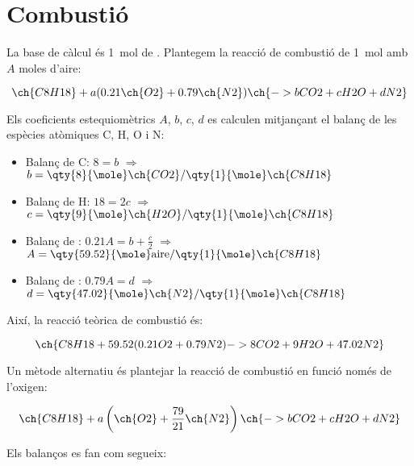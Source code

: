 \chapter{Combustió}

\begin{mybox}[title=Determinació de la reacció teòrica de combustió del \textit{n}-octà amb aire]

    La base de càlcul és \qty{1}{\mole} de . Plantegem la reacció de combustió de \qty{1}{\mole} amb $A$ moles d'aire:

    \begin{equation}
        \ch{C8H18} + a(0.21 \ch{O2} + 0.79 \ch{N2}) \ch{-> b CO2 + c H2O + d N2}
    \end{equation}
    
    Els coeficients estequiomètrics $A$, $b$, $c$, $d$ es calculen mitjançant el balanç de les espècies atòmiques C, H, O i N:
    
    \begin{itemize}
        \item Balanç de C: \quad $8 = b$ \quad $\Rightarrow$ \quad $b = \qty{8}{\mole} \ch{CO2}/\qty{1}{\mole} \ch{C8H18}$
        \item Balanç de H: \quad $18 = 2c$ \quad $\Rightarrow$ \quad $c = \qty{9}{\mole} \ch{H2O}/\qty{1}{\mole} \ch{C8H18}$
        \item Balanç de : \quad $0.21A = b + \frac{c}{2}$ \quad $\Rightarrow$ \quad $A = \qty{59.52}{\mole} \text{aire}/\qty{1}{\mole} \ch{C8H18}$
        \item Balanç de : \quad $0.79A = d$ \quad $\Rightarrow$ \quad $d = \qty{47.02}{\mole} \ch{N2}/\qty{1}{\mole} \ch{C8H18}$
    \end{itemize}
    
    Així, la reacció teòrica de combustió és:
    
    \begin{equation}
        \ch{C8H18 + 59.52( 0.21 O2 + 0.79 N2 ) -> 8 CO2 + 9 H2O + 47.02 N2}
    \end{equation}
    
    Un mètode alternatiu és plantejar la reacció de combustió en funció només de l'oxigen:
    
    \begin{equation}
        \ch{C8H18} + a \left( \ch{O2} + \frac{79}{21} \ch{N2}\right) \ch{-> b CO2 + c H2O + d N2}
    \end{equation}
    
    Els balanços es fan com segueix:
    

\end{mybox}

